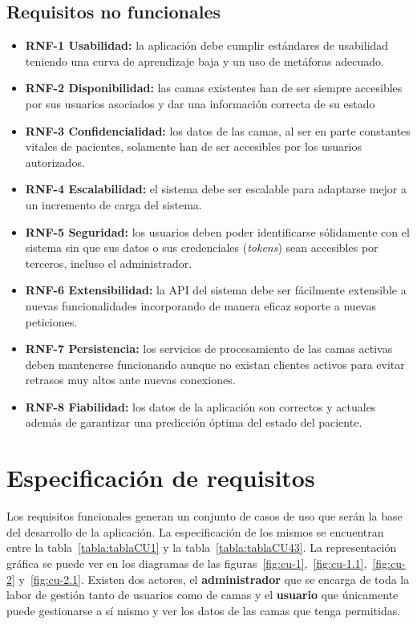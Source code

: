 \subsection{Requisitos no funcionales}\label{requisitos-no-funcionales}
\begin{itemize}
\tightlist
\item
\textbf{RNF-1 Usabilidad:} la aplicación debe cumplir estándares de usabilidad teniendo una curva de aprendizaje baja y un uso de metáforas adecuado.
\item 
\textbf{RNF-2 Disponibilidad:} las camas existentes han de ser siempre accesibles por sus usuarios asociados y dar una información correcta de su estado
\item 
\textbf{RNF-3 Confidencialidad:} los datos de las camas, al ser en parte constantes vitales de pacientes, solamente han de ser accesibles por los usuarios autorizados.
\item
\textbf{RNF-4 Escalabilidad:} el sistema debe ser escalable para adaptarse mejor a un incremento de carga del sistema.
\item 
\textbf{RNF-5 Seguridad:} los usuarios deben poder identificarse sólidamente con el sistema sin que sus datos o sus credenciales (\textit{tokens}) sean accesibles por terceros, incluso el administrador.
\item
\textbf{RNF-6 Extensibilidad:} la API del sistema debe ser fácilmente extensible a nuevas funcionalidades incorporando de manera eficaz soporte a nuevas peticiones.
\item
\textbf{RNF-7 Persistencia:} los servicios de procesamiento de las camas activas deben mantenerse funcionando aunque no existan clientes activos para evitar retrasos muy altos ante nuevas conexiones.
\item
\textbf{RNF-8 Fiabilidad:} los datos de la aplicación son correctos y actuales además de garantizar una predicción óptima del estado del paciente.
\end{itemize}

\section{Especificación de requisitos}\label{casos-uso}

Los requisitos funcionales generan un conjunto de casos de uso que serán la base del desarrollo de la aplicación. La especificación de los mismos se encuentran entre la tabla~\ref{tabla:tablaCU1} y la tabla~\ref{tabla:tablaCU43}. La representación gráfica se puede ver en los diagramas de las figuras~\ref{fig:cu-1},~\ref{fig:cu-1.1},~\ref{fig:cu-2} y~\ref{fig:cu-2.1}. Existen dos actores, el \textbf{administrador} que se encarga de toda la labor de gestión tanto de usuarios como de camas y el \textbf{usuario} que únicamente puede gestionarse a sí mismo y ver los datos de las camas que tenga permitidas.

